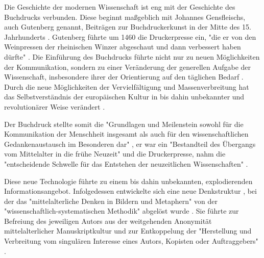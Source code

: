 Die Geschichte der modernen Wissenschaft ist eng mit der Geschichte des Buchdrucks verbunden. Diese beginnt maßgeblich mit Johannes Gensfleischs, auch Gutenberg genannt, Beiträgen zur Buchdruckerkunst \cite{wittmann_1999_geschichte} in der Mitte des 15. Jahrhunderts \cite{suchen}. Gutenberg führte um 1460 die Druckerpresse ein, "die er von den Weinpressen der rheinischen Winzer abgeschaut und dann verbessert haben dürfte" \cite{stober_2014_pressegeschichte}. Die Einführung des Buchdrucks führte nicht nur zu neuen Möglichkeiten der Kommunikation, sondern zu einer Veränderung der generellen Aufgabe der Wissenschaft, insbesondere ihrer der Orientierung auf den täglichen Bedarf \cite{Luhmann1998}. Durch die neue Möglichkeiten der Vervielfältigung und Massenverbreitung hat das Selbstverständnis der europäischen Kultur in bis dahin unbekannter \cite{giesecke_1991_buchdruck} und revolutionärer Weise verändert \cite{wunderlich_2008_buchdruck} \cite{stober_2014_pressegeschichte}.

Der Buchdruck stellte somit die "Grundlagen und Meilenstein sowohl für die Kommunikation der Menschheit insgesamt als auch für den wissenschaftlichen Gedankenaustausch im Besonderen dar" \cite{schirmbacher_2009_wisspub}, er war ein "Bestandteil des Übergangs vom Mittelalter in die frühe Neuzeit" \cite{lange2008medienwettbewerb} und die Druckerpresse, nahm die "entscheidende Schwelle für das Entstehen der neuzeitlichen Wissenschaften" \cite{luhmann_1997_gesellschaft}.

Diese neue Technologie führte zu einem bis dahin unbekannten, explodierenden Informationsangebot. Infolgedessen entwickelte sich eine neue Denkstruktur \cite{eisenstein_1997_druckerpresse}, bei der das "mittelalterliche Denken in Bildern und Metaphern" von der "wissenschaftlich-systematischen Methodik" abgelöst wurde \cite{wunderlich_2008_buchdruck}. Sie führte zur Befreiung des jeweiligen Autors aus der weitgehenden Anonymität mittelalterlicher Manuskriptkultur und zur Entkoppelung der "Herstellung und Verbreitung vom singulären Interesse eines Autors, Kopisten oder Auftraggebers"\cite{wunderlich_2008_buchdruck} \cite{schirmbacher_2009_wisspub}.

